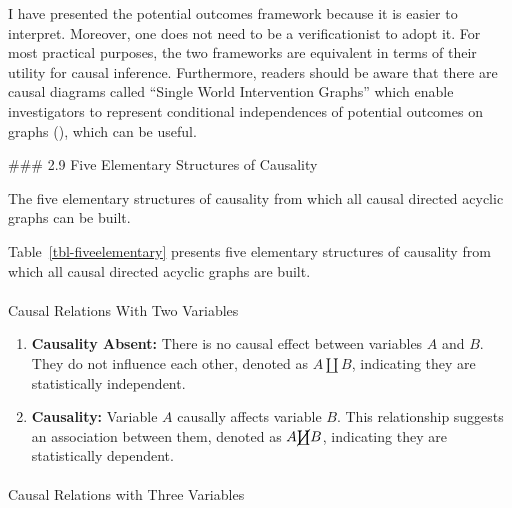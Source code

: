 \documentclass[
  single column]{article}
\makeatletter
\let\oldparagraph\paragraph
\renewcommand{\paragraph}{
    \@ifstar
      \xxxParagraphStar
      \xxxParagraphNoStar
  }
\newcommand{\xxxParagraphStar}[1]{\oldparagraph*{#1}\mbox{}}
\newcommand{\xxxParagraphNoStar}[1]{\oldparagraph{#1}\mbox{}}
\providecommand{\tightlist}{%
  \setlength{\itemsep}{0pt}\setlength{\parskip}{0pt}}\usepackage{longtable,booktabs,array}
\makeatother
\begin{document}
I have presented the potential outcomes framework because it is easier
to interpret. Moreover, one does not need to be a verificationist to
adopt it. For most practical purposes, the two frameworks are equivalent
in terms of their utility for causal inference. Furthermore, readers
should be aware that there are causal diagrams called ``Single World
Intervention Graphs'' which enable investigators to represent
conditional independences of potential outcomes on graphs
(),
which can be useful.

\#\#\# 2.9 Five Elementary Structures of Causality

\begin{table}

\caption{\label{tbl-fiveelementary}The five elementary structures of
causality from which all causal directed acyclic graphs can be built.}

\centering{

\terminologydirectedgraph

}

\end{table}%

Table~\ref{tbl-fiveelementary} presents five elementary structures of
causality from which all causal directed acyclic graphs are built.

\paragraph{Causal Relations With Two
Variables}\label{causal-relations-with-two-variables}

\begin{enumerate}
\def\labelenumi{\arabic{enumi}.}
\tightlist
\item
  \textbf{Causality Absent:} There is no causal effect between variables
  \(A\) and \(B\). They do not influence each other, denoted as
  \(A \coprod B\), indicating they are statistically independent.
\item
  \textbf{Causality:} Variable \(A\) causally affects variable \(B\).
  This relationship suggests an association between them, denoted as
  \(A \cancel{\coprod} B\), indicating they are statistically dependent.
\end{enumerate}

\paragraph{Causal Relations with Three
Variables}\label{causal-relations-with-three-variables}
\end{document}
